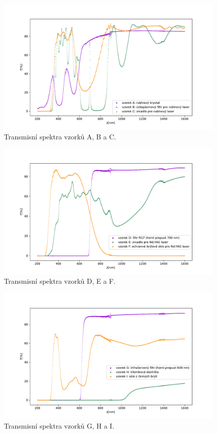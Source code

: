 \begin{figure}[!hbt]
  \centering
    \includegraphics[width=1\textwidth]{img/samples_abc} 
    \caption{Transmisní spektra vzorků A, B a C.}
    \label{fig:abc} %
\end{figure}  

\begin{figure}[!hbt]
  \centering
    \includegraphics[width=1\textwidth]{img/samples_def} 
    \caption{Transmisní spektra vzorků D, E a F.}
    \label{fig:def} %
\end{figure}  

\begin{figure}[!hbt]
  \centering
    \includegraphics[width=1\textwidth]{img/samples_ghi} 
    \caption{Transmisní spektra vzorků G, H a I.}
    \label{fig:ghi} %
\end{figure}  
	
